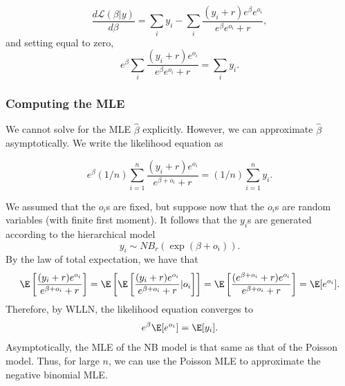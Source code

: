 \documentclass[12pt]{article}
\begin{document}
$$ \frac{ d \mathcal{L} (\beta | y) }{ d \beta } = \sum_i y_i - \sum_i \frac{ (y_i + r) e^\beta e^{o_i} }{ e^\beta e^{o_i} + r },$$ and setting equal to zero,
 $$ e^\beta \sum_i \frac{ (y_i + r) e^{o_i} }{ e^\beta e^{o_i} + r  }  = \sum_i y_i.$$ 
 
 \subsubsection{Computing the MLE}
 
 We cannot solve for the MLE $\hat{\beta}$ explicitly. However, we can approximate $\hat{\beta}$ asymptotically. We write the likelihood equation as
 
 $$e^\beta  (1/n) \sum_{i=1}^n \frac{ (y_i + r)e^{o_i} }{ e^{\beta + o_i} + r } = (1/n) \sum_{i=1}^n y_i.$$ 
 
We assumed that the $o_i$s are fixed, but suppose now that the $o_i$s are random variables (with finite first moment). It follows that the $y_i$s are generated according to the hierarchical model 
$$y_i \sim NB_r(\exp( \beta + o_i)) .$$ By the law of total expectation, we have that
\begin{multline*} \E \left[ \frac{(y_i + r) e^{o_i}}{ e^{\beta + o_i} + r } \right] = \E \left[ \E\left[ \frac{ (y_i + r) e^{o_i} }{ e^{\beta + o_i} + r } | o_i\right] \right] = \E \left[ \frac{ (e^{\beta + o_i} + r) e^{o_i}}{ e^{\beta + o_i} + r } \right] = \E [ e^{o_i} ].
\end{multline*}
 Therefore, by WLLN, the likelihood equation converges to
 $$ e^{\beta} \E[ e^{o_i} ] = \E[y_i].$$ Asymptotically, the MLE of the NB model is that same as that of the Poisson model. Thus, for large $n$, we can use the Poisson MLE to approximate the negative binomial MLE.
 


\end{document}
